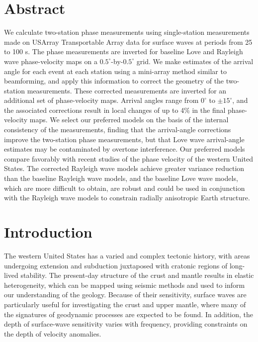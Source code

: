 \documentclass[12pt,oneside]{book}
\newcommand{\degree}[1]{\mbox{$#1^{\circ}$}}
\begin{document}
\section*{Abstract}
We calculate two-station phase measurements using single-station measurements made on USArray Transportable Array data for surface waves at periods from 25 to 100 s. The phase measurements are inverted for baseline Love and Rayleigh wave phase-velocity maps on a \degree{0.5}\nobreakdash-by\nobreakdash-\degree{0.5} grid. We make estimates of the arrival angle for each event at each station using a mini-array method similar to beamforming, and apply this information to correct the geometry of the two-station measurements. These corrected measurements are inverted for an additional set of phase-velocity maps. Arrival angles range from \degree{0} to $\pm \degree{15}$, and the associated corrections result in local changes of up to 4\% in the final phase-velocity maps. We select our preferred models on the basis of the internal consistency of the measurements, finding that the arrival-angle corrections improve the two-station phase measurements, but that Love wave arrival-angle estimates may be contaminated by overtone interference. Our preferred models compare favorably with recent studies of the phase velocity of the western United States. The corrected Rayleigh wave models achieve greater variance reduction than the baseline Rayleigh wave models, and the baseline Love wave models, which are more difficult to obtain, are robust and could be used in conjunction with the Rayleigh wave models to constrain radially anisotropic Earth structure. 


\section{Introduction}

The western United States has a varied and complex tectonic history, with areas undergoing extension and subduction juxtaposed with cratonic regions of long-lived stability. The present-day structure of the crust and mantle results in elastic heterogeneity, which can be mapped using seismic methods and used to inform our understanding of the geology. Because of their sensitivity, surface waves are particularly useful for investigating the crust and upper mantle, where many of the signatures of geodynamic processes are expected to be found. In addition, the depth of surface-wave sensitivity varies with frequency, providing constraints on the depth of velocity anomalies. 
\end{document}
